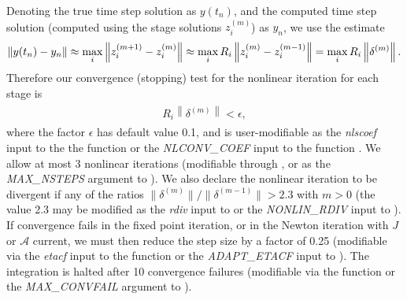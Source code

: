 \documentclass[letterpaper,10pt,english]{sphinxmanual}
\begin{document}
Denoting the true time step solution as \(y(t_n)\), and the computed
time step solution (computed using the stage solutions
\(z_i^{(m)}\)) as \(y_n\), we use the estimate
\begin{gather}
\begin{split}\left\| y(t_n) - y_n \right\| \approx
\max_i \left\| z_i^{(m+1)} - z_i^{(m)} \right\| \approx
\max_i R_i \left\| z_i^{(m)} - z_i^{(m-1)} \right\| =
\max_i R_i \left\| \delta^{(m)} \right\|.\end{split}\notag
\end{gather}
Therefore our convergence (stopping) test for the nonlinear iteration
for each stage is
\label{Mathematics:equation-NonlinearTolerance}\begin{gather}
\begin{split}R_i \left\|\delta^{(m)} \right\| < \epsilon,\end{split}\label{Mathematics-NonlinearTolerance}
\end{gather}
where the factor \(\epsilon\) has default value 0.1, and is
user-modifiable as the \emph{nlscoef} input to the the function
{\hyperref[c_interface/User_callable:c.ARKodeSetNonlinConvCoef]{\emph{}}} or the \emph{NLCONV\_COEF} input to the
function {\hyperref[f_interface/Usage:f/_/FARKSETRIN]{\emph{}}}.  We allow at most 3 nonlinear
iterations (modifiable through {\hyperref[c_interface/User_callable:c.ARKodeSetMaxNonlinIters]{\emph{}}}, or
as the \emph{MAX\_NSTEPS} argument to {\hyperref[f_interface/Usage:f/_/FARKSETIIN]{\emph{}}}).  We also
declare the nonlinear iteration to be divergent if any of the ratios
\(\|\delta^{(m)}\| / \|\delta^{(m-1)}\| > 2.3\) with \(m>0\)
(the value 2.3 may be modified as the \emph{rdiv} input to
{\hyperref[c_interface/User_callable:c.ARKodeSetNonlinRDiv]{\emph{}}} or the \emph{NONLIN\_RDIV} input to
{\hyperref[f_interface/Usage:f/_/FARKSETRIN]{\emph{}}}).  If convergence fails in the fixed
point iteration, or in the Newton iteration with \(J\) or
\({\mathcal A}\) current, we must then reduce the step size by a
factor of 0.25 (modifiable via the \emph{etacf} input to the
{\hyperref[c_interface/User_callable:c.ARKodeSetMaxCFailGrowth]{\emph{}}} function or the \emph{ADAPT\_ETACF}
input to {\hyperref[f_interface/Usage:f/_/FARKSETRIN]{\emph{}}}).  The integration is halted after 10
convergence failures (modifiable via the
{\hyperref[c_interface/User_callable:c.ARKodeSetMaxConvFails]{\emph{}}} function or the \emph{MAX\_CONVFAIL}
argument to {\hyperref[f_interface/Usage:f/_/FARKSETIIN]{\emph{}}}).
\end{document}

